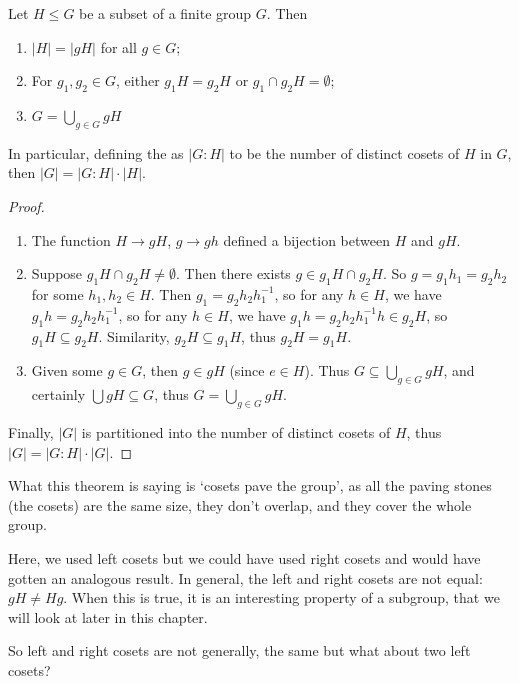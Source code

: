 \documentclass[a4]{scrreprt}
\begin{document}
\begin{theorem}
	Let $H \leq G$ be a subset of a finite group $G$. Then
	\begin{enumerate}[label=(\roman*)]
		\item $|H| = |gH|$ for all $g \in G$;
		\item For $g_1, g_2 \in G$, either $g_1 H = g_2 H$ or $g_1 
		\cap g_2 H = \emptyset$;
		\item $\displaystyle G = \bigcup_{g \in G} gH$
	\end{enumerate}
	In particular, defining the  as $|G : H|$ to be the number of distinct cosets of $H$ in $G$, then $|G| = |G : H| \cdot |H|$.
\end{theorem}
\begin{proof}$ $
	\begin{enumerate}[label=(\roman*)]
		\item The function $H \rightarrow gH$, $g \rightarrow gh$ defined a bijection between $H$ and $gH$.
		\item Suppose $g_1 H \cap g_2 H \neq \emptyset$. Then there exists $g \in g_1 H \cap g_2 H$. So $g = g_1 h_1 = g_2 h_2$ for some $h_1, h_2 \in H$. Then $g_1 = g_2 h_2 h_1^{-1}$, so for any $h \in H$, we have $g_1 h = g_2 h_2 h_1^{-1}$, so for any $h \in H$, we have $g_1 h = g_2 h_2 h_1^{-1} h \in g_2 H$, so $g_1 H \subseteq g_2 H$. Similarity, $g_2 H \subseteq g_1 H$, thus $g_2 H = g_1 H$.
		\item Given some $g \in G$, then $g \in gH$ (since $e \in H$). Thus $G \subseteq \bigcup_{g \in G} gH$, and certainly $\bigcup gH \subseteq G$, thus $G = \bigcup_{g \in G} gH$.
	\end{enumerate}
	Finally, $|G|$ is partitioned into the number of distinct cosets of $H$, thus $|G| = |G:H|\cdot |G|$.
\end{proof}

What this theorem is saying is `cosets pave the group', as all the paving stones (the cosets) are the same size, they don't overlap, and they cover the whole group.

Here, we used left cosets but we could have used right cosets and would have gotten an analogous result. In general, the left and right cosets are not equal: $gH \neq Hg$. When this is true, it is an interesting property of a subgroup, that we will look at later in this chapter. 

So left and right cosets are not generally, the same but what about two left cosets?
\end{document}
